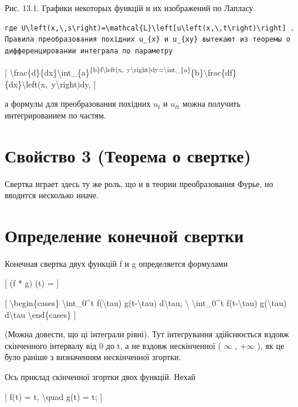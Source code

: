 \documentclass[
]{article}
\begin{document}
Рис. 13.1. Графики некоторых функцій и их изображений по Лапласу.

\begin{verbatim}
где U\left(x,\,s\right)=\mathcal{L}\left[u\left(x,\,t\right)\right] . Правила преобразования похідних u_{x} и u_{xy} вытекают из теоремы о дифференцировании интеграла по параметру
\end{verbatim}

{[}
\textbackslash frac\{d\}\{dx\}\textbackslash int\_\{a\}\textsuperscript{\{b\}f\textbackslash left(x,~y\textbackslash right)dy=\textbackslash int\_\{a\}}\{b\}\textbackslash frac\{df\}\{dx\}\textbackslash left(x,~y\textbackslash right)dy,
{]}

а формулы для преобразования похідних \(u_t\) и \(u_{tt}\) можна
получить интегрированием по частям.

\section{Свойство 3 (Теорема о
свертке)}\label{ux441ux432ux43eux439ux441ux442ux432ux43e-3-ux442ux435ux43eux440ux435ux43cux430-ux43e-ux441ux432ux435ux440ux442ux43aux435}

Свертка играет здесь ту же роль, що и в теории преобразования Фурье, но
вводится несколько иначе.

\section{Определение конечной
свертки}\label{ux43eux43fux440ux435ux434ux435ux43bux435ux43dux438ux435-ux43aux43eux43dux435ux447ux43dux43eux439-ux441ux432ux435ux440ux442ux43aux438}

Конечная свертка двух функцій f и g определяется формулами

{[} (f * g) (t) = {]}

{[} \textbackslash begin\{cases\} \textbackslash int\_0\^{}t
f(\textbackslash tau) g(t-\textbackslash tau) d\textbackslash tau,
\textbackslash{} \textbackslash int\_0\^{}t f(t-\textbackslash tau)
g(\textbackslash tau) d\textbackslash tau \textbackslash end\{cases\}
{]}

(Можна довести, що ці інтеграли рівні). Тут інтегрування здійснюється
вздовж скінченного інтервалу від 0 до t, а не вздовж нескінченної (
\(\infty\) , \(+\infty\) ), як це було раніше з визначенням нескінченної
згортки.

Ось приклад скінченної згортки двох функцій. Нехай

{[} f(t) = t, \textbackslash quad g(t) = t; {]}
\end{document}
